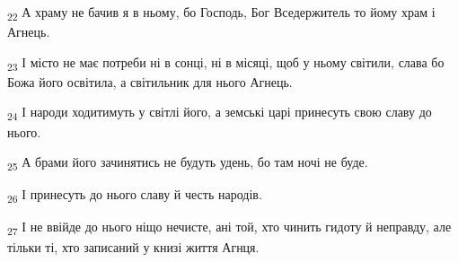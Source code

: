 \begin{tcolorbox}
\textsubscript{22} А храму не бачив я в ньому, бо Господь, Бог Вседержитель то йому храм і Агнець.
\end{tcolorbox}
\begin{tcolorbox}
\textsubscript{23} І місто не має потреби ні в сонці, ні в місяці, щоб у ньому світили, слава бо Божа його освітила, а світильник для нього Агнець.
\end{tcolorbox}
\begin{tcolorbox}
\textsubscript{24} І народи ходитимуть у світлі його, а земські царі принесуть свою славу до нього.
\end{tcolorbox}
\begin{tcolorbox}
\textsubscript{25} А брами його зачинятись не будуть удень, бо там ночі не буде.
\end{tcolorbox}
\begin{tcolorbox}
\textsubscript{26} І принесуть до нього славу й честь народів.
\end{tcolorbox}
\begin{tcolorbox}
\textsubscript{27} І не ввійде до нього ніщо нечисте, ані той, хто чинить гидоту й неправду, але тільки ті, хто записаний у книзі життя Агнця.
\end{tcolorbox}
